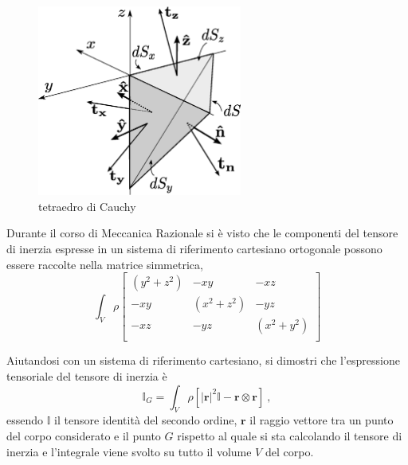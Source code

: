 \begin{figure}
\centering
 \includegraphics[width=0.60\textwidth]{./fig/cauchy.eps}
\caption{tetraedro di Cauchy}\label{fig:tetraedroCauchy}
\end{figure}

\begin{example} Durante il corso di Meccanica Razionale si è visto che le componenti del tensore di inerzia espresse in un sistema di riferimento cartesiano ortogonale possono essere raccolte nella matrice simmetrica,
\begin{equation}
 \int_V \rho
 \begin{bmatrix}
   (y^2+z^2) &     -xy    &    -xz     \\ 
      -xy    &  (x^2+z^2) &    -yz     \\ 
      -xz    &     -yz    &  (x^2+y^2) \\ 
 \end{bmatrix}
\end{equation}
\begin{exercise} 
   Aiutandosi con un sistema di riferimento cartesiano, si dimostri che l'espressione tensoriale del tensore di inerzia è
    \begin{equation}
      \mathbb{I}_G = \int_V \rho \left[ |\bm{r}|^2 \mathbb{I} 
         - \bm{r} \otimes \bm{r} \right] \ ,
    \end{equation}
    essendo $\mathbb{I}$ il tensore identità del secondo ordine, $\bm{r}$ il raggio vettore tra un punto del corpo considerato e il punto $G$ rispetto al quale si sta calcolando il tensore di inerzia e l'integrale viene svolto su tutto il volume $V$ del corpo.
\end{exercise}
\end{example}

